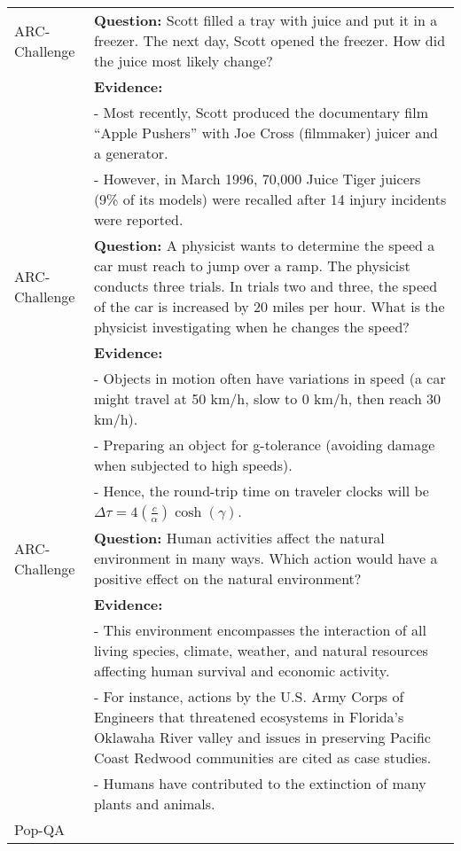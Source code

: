 \begin{table*}[t]
\centering
\footnotesize
\begin{tabularx}{\textwidth}{lX}
\toprule
\midrule
ARC-Challenge & 
\textbf{Question:} Scott filled a tray with juice and put it in a freezer. The next day, Scott opened the freezer. How did the juice most likely change?\\[1ex]
& \textbf{Evidence:}\\
& \quad - Most recently, Scott produced the documentary film “Apple Pushers” with Joe Cross (filmmaker) juicer and a generator.\\[0.5ex]
& \quad - However, in March 1996, 70,000 Juice Tiger juicers (9\% of its models) were recalled after 14 injury incidents were reported.\\[1ex]
ARC-Challenge & 
\textbf{Question:} A physicist wants to determine the speed a car must reach to jump over a ramp. The physicist conducts three trials. In trials two and three, the speed of the car is increased by 20 miles per hour. What is the physicist investigating when he changes the speed?\\[1ex]
& \textbf{Evidence:}\\
& \quad - Objects in motion often have variations in speed (a car might travel at 50 km/h, slow to 0 km/h, then reach 30 km/h).\\[0.5ex]
& \quad - Preparing an object for g-tolerance (avoiding damage when subjected to high speeds).\\[0.5ex]
& \quad - Hence, the round-trip time on traveler clocks will be $\Delta \tau = 4\left(\frac{c}{\alpha}\right)\cosh(\gamma)$.\\[1ex]
ARC-Challenge & 
\textbf{Question:} Human activities affect the natural environment in many ways. Which action would have a positive effect on the natural environment?\\[1ex]
& \textbf{Evidence:}\\
& \quad - This environment encompasses the interaction of all living species, climate, weather, and natural resources affecting human survival and economic activity.\\[0.5ex]
& \quad - For instance, actions by the U.S. Army Corps of Engineers that threatened ecosystems in Florida's Oklawaha River valley and issues in preserving Pacific Coast Redwood communities are cited as case studies.\\[0.5ex]
& \quad - Humans have contributed to the extinction of many plants and animals.\\
Pop-QA & 

\end{tabularx}
\end{table*}
